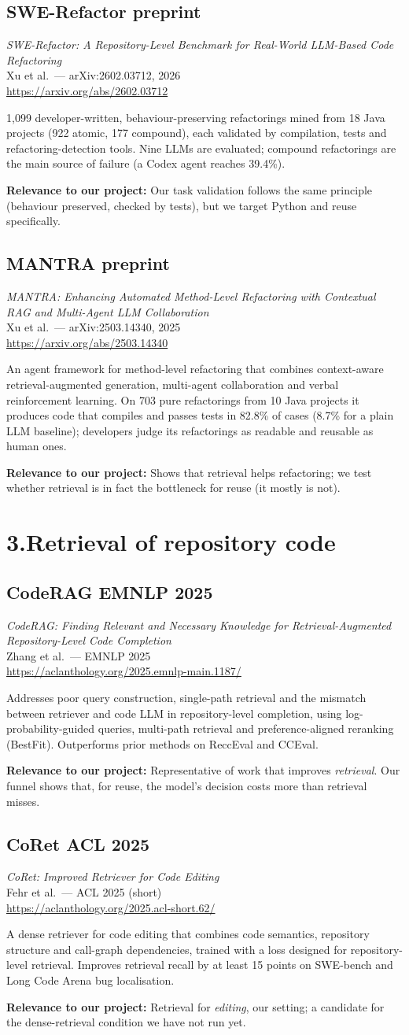 \documentclass[11pt,a4paper]{article}
\newcommand{\tagbox}[2]{\colorbox{#1!15}{\textcolor{#1!80!black}{\footnotesize\textbf{#2}}}}
\newcommand{\paper}[6]{%
  \subsection*{#1 \hfill #4}
  \textit{#2}\\
  {\small #3}\\
  {\small\url{#5}}\par
  #6
  \vspace{0.4em}}
\newcommand{\why}[1]{\par\textbf{Relevance to our project:} #1}
\begin{document}
\paper{SWE-Refactor}
{SWE-Refactor: A Repository-Level Benchmark for Real-World LLM-Based Code Refactoring}
{Xu et al.\ --- arXiv:2602.03712, 2026}
{\tagbox{preprint}{preprint}}
{https://arxiv.org/abs/2602.03712}
{1,099 developer-written, behaviour-preserving refactorings mined from 18 Java projects (922 atomic,
177 compound), each validated by compilation, tests and refactoring-detection tools. Nine LLMs are
evaluated; compound refactorings are the main source of failure (a Codex agent reaches 39.4\%).
\why{Our task validation follows the same principle (behaviour preserved, checked by tests), but we
target Python and reuse specifically.}}

\paper{MANTRA}
{MANTRA: Enhancing Automated Method-Level Refactoring with Contextual RAG and Multi-Agent LLM Collaboration}
{Xu et al.\ --- arXiv:2503.14340, 2025}
{\tagbox{preprint}{preprint}}
{https://arxiv.org/abs/2503.14340}
{An agent framework for method-level refactoring that combines context-aware retrieval-augmented
generation, multi-agent collaboration and verbal reinforcement learning. On 703 pure refactorings from
10 Java projects it produces code that compiles and passes tests in 82.8\% of cases (8.7\% for a plain
LLM baseline); developers judge its refactorings as readable and reusable as human ones.
\why{Shows that retrieval helps refactoring; we test whether retrieval is in fact the bottleneck for
reuse (it mostly is not).}}

\section{3.\quad Retrieval of repository code}

\paper{CodeRAG}
{CodeRAG: Finding Relevant and Necessary Knowledge for Retrieval-Augmented Repository-Level Code Completion}
{Zhang et al.\ --- EMNLP 2025}
{\tagbox{main}{EMNLP 2025}}
{https://aclanthology.org/2025.emnlp-main.1187/}
{Addresses poor query construction, single-path retrieval and the mismatch between retriever and code LLM
in repository-level completion, using log-probability-guided queries, multi-path retrieval and
preference-aligned reranking (BestFit). Outperforms prior methods on ReccEval and CCEval.
\why{Representative of work that improves \emph{retrieval}. Our funnel shows that, for reuse, the
model's decision costs more than retrieval misses.}}

\paper{CoRet}
{CoRet: Improved Retriever for Code Editing}
{Fehr et al.\ --- ACL 2025 (short)}
{\tagbox{main}{ACL 2025}}
{https://aclanthology.org/2025.acl-short.62/}
{A dense retriever for code editing that combines code semantics, repository structure and call-graph
dependencies, trained with a loss designed for repository-level retrieval. Improves retrieval recall by
at least 15 points on SWE-bench and Long Code Arena bug localisation.
\why{Retrieval for \emph{editing}, our setting; a candidate for the dense-retrieval condition we have not
run yet.}}
\end{document}
